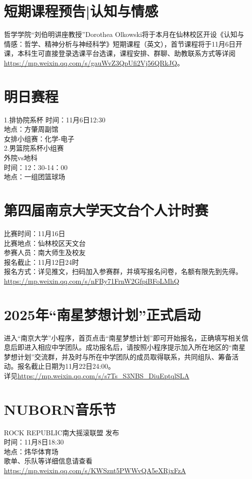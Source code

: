 \documentclass[letterpaper, 12pt]{article}
\begin{document}
\begin{multicols}{2}
\section{短期课程预告|认知与情感}
哲学学院“刘伯明讲座教授”Dorothea Olkowski将于本月在仙林校区开设《认知与情感：哲学、精神分析与神经科学》短期课程（英文），首节课程将于11月6日开课，本科生可直接登录选课平台选课，课程安排、群聊、助教联系方式等详阅\url{https://mp.weixin.qq.com/s/gauWvZ3QpUfi2Vj56QRkJQ}。

\section{明日赛程}
1.排协院系杯
时间：11月6日12:30\\
地点：方肇周副馆\\
女排小组赛：化学-电子\\
2.男篮院系杯小组赛\\
外院vs地科\\
时间：12：30-14：00\\
地点：一组团篮球场\\

\section{第四届南京大学天文台个人计时赛}
比赛时间：11月16日\\
比赛地点：仙林校区天文台\\
参赛人员：南大师生及校友\\
报名截止：11月12日24时\\
报名方式：详见推文，扫码加入参赛群，并填写报名问卷，名额有限先到先得。\\
\url{https://mp.weixin.qq.com/s/nFBy71FrnW2GfpiBFoLMhQ}

\section{2025年“南星梦想计划”正式启动}
进入“南京大学”小程序，首页点击“南星梦想计划”即可开始报名，正确填写相关信息后即进入相应中学团队。成功报名后，请按照小程序提示加入所在地区的“南星梦想计划”交流群，并及时与所在中学团队的成员取得联系，共同组队、筹备活动。报名截止日期为11月22日24:00。\\
详见\url{https://mp.weixin.qq.com/s/s7Ts_S3NBS_DiuEptqlSLA}

\section{NUBORN音乐节}
ROCK REPUBLIC南大摇滚联盟 发布\\
时间：11月8日18:30\\
地点：炜华体育场\\
歌单、乐队等详细信息请查看\url{https://mp.weixin.qq.com/s/KWSznt5PWWvQA5eXRjxFzA}\\


\end{multicols}
\end{document}
